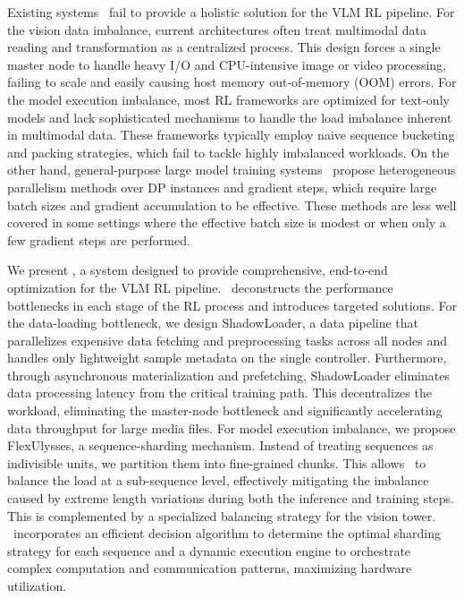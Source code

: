 Existing systems~\citep{verl, openrlhf,streamRL,slime,areal,miroRL} fail to provide a holistic solution for the VLM RL pipeline. For the vision data imbalance, current architectures often treat multimodal data reading and transformation as a centralized process. This design forces a single master node to handle heavy I/O and CPU-intensive image or video processing, failing to scale and easily causing host memory out-of-memory (OOM) errors. For the model execution imbalance, most RL frameworks are optimized for text-only models and lack sophisticated mechanisms to handle the load imbalance inherent in multimodal data. These frameworks typically employ naive sequence bucketing and packing strategies, which fail to tackle highly imbalanced workloads.
On the other hand, general-purpose large model training systems~\citep{FlexSP,WLB-LLM,Hydraulis,HotSPa,ByteScale} propose heterogeneous parallelism methods over DP instances and gradient steps, which require large batch sizes and gradient accumulation to be effective. These methods are less well covered in some settings where the effective batch size is modest or when only a few gradient steps are performed.

We present \SysName, a system designed to provide comprehensive, end-to-end optimization for the VLM RL pipeline. \SysName~deconstructs the performance bottlenecks in each stage of the RL process and introduces targeted solutions. For the data-loading bottleneck, we design ShadowLoader, a data pipeline that parallelizes expensive data fetching and preprocessing tasks across all nodes and handles only lightweight sample metadata on the single controller. Furthermore, through asynchronous materialization and prefetching, ShadowLoader eliminates data processing latency from the critical training path. This decentralizes the workload, eliminating the master-node bottleneck and significantly accelerating data throughput for large media files. For model execution imbalance, we propose FlexUlysses, a sequence-sharding mechanism. Instead of treating sequences as indivisible units, we partition them into fine-grained chunks. This allows \SysName~to balance the load at a sub-sequence level, effectively mitigating the imbalance caused by extreme length variations during both the inference and training steps. This is complemented by a specialized balancing strategy for the vision tower. \SysName~incorporates an efficient decision algorithm to determine the optimal sharding strategy for each sequence and a dynamic execution engine to orchestrate complex computation and communication patterns, maximizing hardware utilization.

